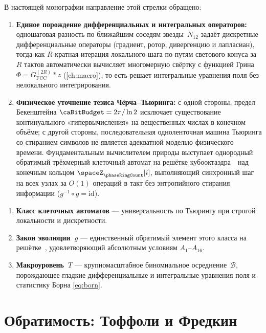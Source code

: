 В настоящей монографии направление этой стрелки обращено:
\begin{enumerate}[leftmargin=*]
\item \textbf{Единое порождение дифференциальных и интегральных операторов:}
  одношаговая разность по ближайшим соседям звезды~$N_{12}$ задаёт дискретные дифференциальные операторы (градиент, ротор, дивергенцию и лапласиан), тогда как $R$-кратная итерация локального шага по путям светового конуса за $R$ тактов автоматически вычисляет многомерную свёртку с функцией Грина $\Phi = G_{\mathrm{FCC}}^{(2R)} * z$ (\cref{ch:macro}), то есть решает интегральные уравнения поля без нелокального интегрирования.
\item \textbf{Физическое уточнение тезиса Чёрча--Тьюринга:}
  с одной стороны, предел Бекенштейна $\caBitBudget = 2\pi/\ln 2$ исключает существование континуального «гипервычисления» на вещественных числах в конечном объёме;
  с другой стороны, последовательная одноленточная машина Тьюринга со стиранием символов не является адекватной моделью физического времени.
  Фундаментальным вычислителем природы выступает однородный обратимый трёхмерный клеточный автомат на решётке кубооктаэдра~\latGCKshort\ над конечным кольцом $\spaceZ_{\phaseRingCount}[i]$, выполняющий синхронный шаг на всех узлах за $O(1)$ операций в такт без энтропийного стирания информации ($g^{-1}\circ g = \mathrm{id}$).
\end{enumerate}

\begin{remark}
\begin{enumerate}
\item \textbf{Класс клеточных автоматов} --- универсальность по Тьюрингу при строгой локальности и дискретности.
\item \textbf{Закон эволюции~$g$} --- единственный обратимый элемент этого класса на решётке~\latGCK, удовлетворяющий абсолютным условиям $A_1$--$A_{16}$.
\item \textbf{Макроуровень~$T$} --- крупномасштабное биномиальное осреднение~$\mathcal{B}$, порождающее гладкие дифференциальные и интегральные уравнения поля и статистику Борна \eqref{eq:born}.
\end{enumerate}
\end{remark}

\section{Обратимость: Тоффоли и Фредкин}

